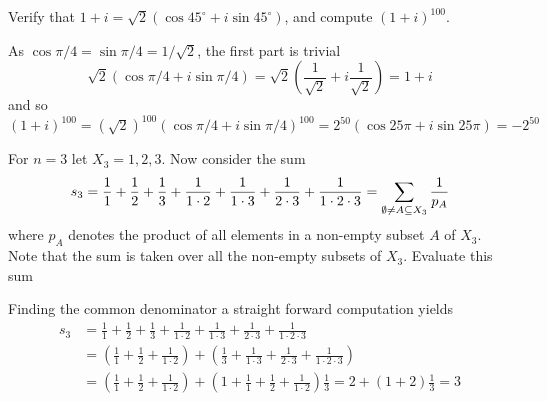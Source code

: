 \documentclass[a4paper, english, 12pt]{article} %
\begin{document}
\begin{subproblem}
  Verify that $1 + i = \sqrt{2}(\cos 45^\circ + i \sin 45^\circ)$, and compute $(1+i)^{100}$.
\end{subproblem}

\begin{answer}
  As $\cos \pi/4 = \sin \pi/4 = 1/\sqrt{2}$, the first part is trivial
  \begin{equation*}
    \sqrt{2}( \cos \pi/4 + i \sin \pi/4) = \sqrt{2}\left( \frac{1}{\sqrt{2}} + i \frac{1}{\sqrt{2}} \right) = 1 + i
  \end{equation*}
  and so $(1+i)^{100} = (\sqrt{2})^{100}(\cos \pi/4 + i\sin \pi/4)^{100} =
  2^{50}(\cos 25 \pi + i \sin 25 \pi) = -2^{50}$
\end{answer}

\begin{problem}[16]
  \begin{subproblem}
    \label{subprob:16a}
    For $n=3$ let $X_3 = {1,2,3}$. Now consider the sum
    \begin{equation*}
      s_3 = \frac{1}{1} + \frac{1}{2} + \frac{1}{3}
      + \frac{1}{1\cdot 2} + \frac{1}{ 1 \cdot 3} + \frac{1}{2 \cdot 3} + \frac{1}{1 \cdot 2 \cdot 3} \\
       = \sum_{\emptyset \neq A \subseteq X_3} \frac{1}{p_A}
     \end{equation*}
     where $p_A$ denotes the product of all elements in a non-empty subset $A$
     of $X_3$. Note that the sum is taken over all the non-empty subsets of
     $X_3$. Evaluate this sum
  \end{subproblem}
\end{problem}

\begin{answer}
  Finding the common denominator a straight forward computation yields
  \begin{align*}
      s_3 & = \frac{1}{1} + \frac{1}{2} + \frac{1}{3}
    + \frac{1}{1\cdot 2} + \frac{1}{ 1 \cdot 3} + \frac{1}{2 \cdot 3} + \frac{1}{1 \cdot 2 \cdot 3} \\
          & = \left(   \frac{1}{1} + \frac{1}{2} + \frac{1}{1 \cdot 2} \right)
            + \left(  \frac{1}{3} + \frac{1}{1\cdot 3} + \frac{1}{2 \cdot 3} + \frac{1}{1 \cdot 2 \cdot 3} \right)\\
          & = \left(   \frac{1}{1} + \frac{1}{2} + \frac{1}{1 \cdot 2} \right)
            + \left( 1 + \frac{1}{1} + \frac{1}{2} + \frac{1}{1 \cdot 2} \right)\frac{1}{3}
            = 2 + (1 + 2)\frac{1}{3} = 3
  \end{align*}
\end{answer}
\end{document}
